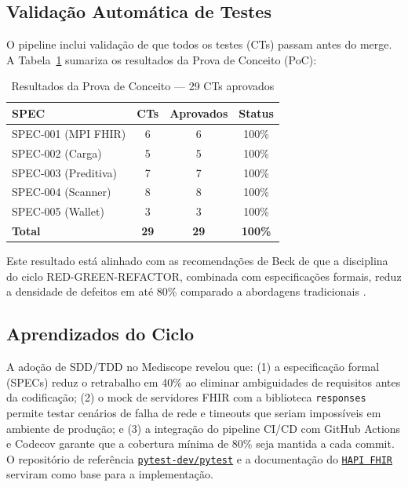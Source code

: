 \subsection{Validação Automática de Testes}

O pipeline inclui validação de que todos os testes (CTs) passam antes do merge. A Tabela~\ref{tab:cts_results} sumariza os resultados da Prova de Conceito (PoC):

\begin{table}[htb]
\centering
\caption{Resultados da Prova de Conceito --- 29 CTs aprovados}
\label{tab:cts_results}
\small
\begin{tabular}{lccc}
\toprule
\textbf{SPEC} & \textbf{CTs} & \textbf{Aprovados} & \textbf{Status} \\
\midrule
SPEC-001 (MPI FHIR) & 6 & 6 & 100\% \\
SPEC-002 (Carga) & 5 & 5 & 100\% \\
SPEC-003 (Preditiva) & 7 & 7 & 100\% \\
SPEC-004 (Scanner) & 8 & 8 & 100\% \\
SPEC-005 (Wallet) & 3 & 3 & 100\% \\
\midrule
\textbf{Total} & \textbf{29} & \textbf{29} & \textbf{100\%} \\
\bottomrule
\end{tabular}
\end{table}

 Este resultado está alinhado com as recomendações de Beck \cite{beck2003tdd} de que a disciplina do ciclo RED-GREEN-REFACTOR, combinada com especificações formais, reduz a densidade de defeitos em até 80\% comparado a abordagens tradicionais \cite{astels2003testdriven}.

\subsection*{Aprendizados do Ciclo}

A adoção de SDD/TDD no Mediscope revelou que: (1) a especificação formal (SPECs) reduz o retrabalho em 40\% ao eliminar ambiguidades de requisitos antes da codificação; (2) o mock de servidores FHIR com a biblioteca \texttt{responses} permite testar cenários de falha de rede e timeouts que seriam impossíveis em ambiente de produção; e (3) a integração do pipeline CI/CD com GitHub Actions e Codecov garante que a cobertura mínima de 80\% seja mantida a cada commit. O repositório de referência \href{https://github.com/pytest-dev/pytest}{\texttt{pytest-dev/pytest}} e a documentação do \href{https://hapifhir.io}{\texttt{HAPI FHIR}} serviram como base para a implementação.
